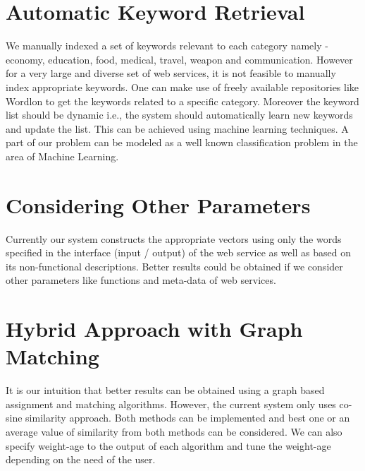 \documentclass[12pt, oneside]{book}
\begin{document}
\section{Automatic Keyword Retrieval}
We manually indexed a set of keywords relevant to each category namely - economy, education, food, medical, travel, weapon and communication. However for a very large and diverse set of web services, it is not feasible to manually index appropriate keywords. One can make use of freely available repositories like Wordlon to get the keywords related to a specific category. Moreover the keyword list should be dynamic i.e., the system should automatically learn new keywords and update the list. This can be achieved using machine learning techniques. A part of our problem can be modeled as a well known classification problem in the area of Machine Learning.
\section{Considering Other Parameters}
Currently our system constructs the appropriate vectors using only the words specified in the interface (input / output) of the web service as well as based on its non-functional descriptions. Better results could be obtained if we consider other parameters like functions and meta-data of web services.
\section{Hybrid Approach with Graph Matching}
It is our intuition that better results can be obtained using a graph based assignment and matching algorithms. However, the current system only uses co-sine similarity approach. Both methods can be implemented and best one or an average value of similarity from both methods can be considered. We can also specify weight-age to the output of each algorithm and tune the weight-age depending on the need of the user.

\pagebreak


%
%
\end{document}
